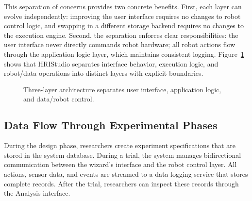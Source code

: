 This separation of concerns provides two concrete benefits. First, each layer can evolve independently: improving the user interface requires no changes to robot control logic, and swapping in a different storage backend requires no changes to the execution engine. Second, the separation enforces clear responsibilities: the user interface never directly commands robot hardware; all robot actions flow through the application logic layer, which maintains consistent logging. Figure~\ref{fig:three-tier} shows that HRIStudio separates interface behavior, execution logic, and robot/data operations into distinct layers with explicit boundaries.

\begin{figure}[htbp]
\centering
{}
\caption{Three-layer architecture separates user interface, application logic, and data/robot control.}
\label{fig:three-tier}
\end{figure}

\subsection{Data Flow Through Experimental Phases}

During the design phase, researchers create experiment specifications that are stored in the system database. During a trial, the system manages bidirectional communication between the wizard's interface and the robot control layer. All actions, sensor data, and events are streamed to a data logging service that stores complete records. After the trial, researchers can inspect these records through the Analysis interface.

